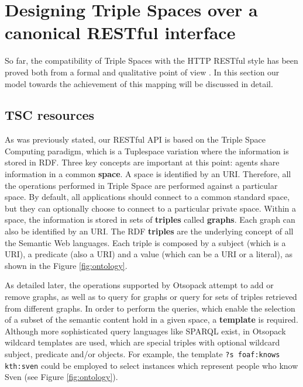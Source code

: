 \section{Designing Triple Spaces over a canonical RESTful interface}

So far, the compatibility of Triple Spaces with the HTTP RESTful style has been proved both from a formal \cite{hernandez_formal_2010} and qualitative point of view \cite{gomez-goiri_complementarity_2011}.
In this section our model towards the achievement of this mapping will be discussed in detail.

\subsection{TSC resources}

As was previously stated, our RESTful API is based on the Triple Space Computing paradigm, which is a Tuplespace variation where the information is stored in RDF.
Three key concepts are important at this point: agents share information in a common \textbf{space}.
A space is identified by an URI.
Therefore, all the operations performed in Triple Space are performed against a particular space.
By default, all applications should connect to a common standard space, but they can optionally choose to connect to a particular private space.
Within a space, the information is stored in sets of \textbf{triples} called \textbf{graphs}.
Each graph can also be identified by an URI. The RDF \textbf{triples} are the underlying concept of all the Semantic Web languages.
Each triple is composed by a subject (which is a URI), a predicate (also a URI) and a value (which can be a URI or a literal), as shown in the Figure \ref{fig:ontology}.

As detailed later, the operations supported by Otsopack attempt to add or remove graphs, as well as to query for graphs or query for sets of triples retrieved from different graphs.
In order to perform the queries, which enable the selection of a subset of the semantic content hold in a given space, a \textbf{template} is required.
Although more sophisticated query languages like SPARQL exist, in Otsopack wildcard templates are used, which are special triples with optional wildcard subject, predicate and/or objects.
For example, the template \texttt{?s foaf:knows kth:sven} could be employed to select instances which represent people who know Sven (see Figure \ref{fig:ontology}).


